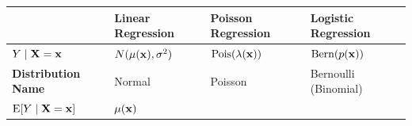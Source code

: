 \documentclass[]{book}
\begin{document}
\begin{longtable}[]{@{}llll@{}}
\toprule
\begin{minipage}[b]{0.20\columnwidth}\raggedright
\strut
\end{minipage} & \begin{minipage}[b]{0.21\columnwidth}\raggedright
Linear Regression\strut
\end{minipage} & \begin{minipage}[b]{0.23\columnwidth}\raggedright
Poisson Regression\strut
\end{minipage} & \begin{minipage}[b]{0.24\columnwidth}\raggedright
Logistic Regression\strut
\end{minipage}\tabularnewline
\midrule
\endhead
\begin{minipage}[t]{0.20\columnwidth}\raggedright
\(Y \mid {\bf X} = {\bf x}\)\strut
\end{minipage} & \begin{minipage}[t]{0.21\columnwidth}\raggedright
\(N(\mu({\bf x}), \sigma^2)\)\strut
\end{minipage} & \begin{minipage}[t]{0.23\columnwidth}\raggedright
\(\text{Pois}(\lambda({\bf x}))\)\strut
\end{minipage} & \begin{minipage}[t]{0.24\columnwidth}\raggedright
\(\text{Bern}(p({\bf x}))\)\strut
\end{minipage}\tabularnewline
\begin{minipage}[t]{0.20\columnwidth}\raggedright
\textbf{Distribution Name}\strut
\end{minipage} & \begin{minipage}[t]{0.21\columnwidth}\raggedright
Normal\strut
\end{minipage} & \begin{minipage}[t]{0.23\columnwidth}\raggedright
Poisson\strut
\end{minipage} & \begin{minipage}[t]{0.24\columnwidth}\raggedright
Bernoulli (Binomial)\strut
\end{minipage}\tabularnewline
\begin{minipage}[t]{0.20\columnwidth}\raggedright
\(\text{E}[Y \mid {\bf X} = {\bf x}]\)\strut
\end{minipage} & \begin{minipage}[t]{0.21\columnwidth}\raggedright
\(\mu({\bf x})\)\strut
\end{minipage} & \begin{minipage}[t]{0.23\columnwidth}\raggedright

\end{minipage}
\end{longtable}
\end{document}
